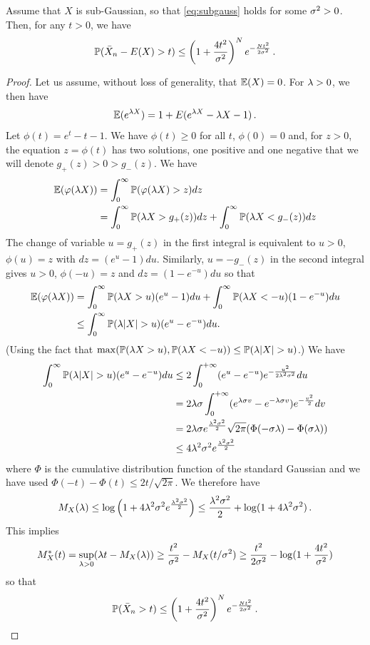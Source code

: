 \begin{proposition}
\label{prop:subg}
Assume that $X$ is sub-Gaussian, so that \eqref{eq:subgauss} holds for some $\sigma^2>0$. Then, for any $t>0$, we have
\[
\bm{\mathbb P}(\bar X_n - E(X) > t) \leq \left(1 + \frac{4t^2}{\sigma^2}\right)^N e^{-\frac{Nt^2}{2\sigma^2}}\,.
\]
\end{proposition}
\begin{proof}
Let us assume, without loss of generality, that $\bm{\mathbb E}(X) = 0$. For  $\lambda>0$, we then have
\[
\bm{\mathbb E}(e^{\lambda X}) = 1 + E(e^{\lambda X} - \lambda X - 1)\,.
\]
Let $\phi(t) = e^t - t - 1$. We have $\phi(t) \geq 0$ for all $t$, $\phi(0) = 0$ and, for $z>0$, the equation $z = \phi(t)$ has two solutions, one positive and one negative that we will denote $g_+(z) > 0 > g_-(z)$. We have
\begin{align*}
\bm{\mathbb E}(\varphi(\lambda X)) &= \int_0^\infty \bm{\mathbb P}(\varphi(\lambda X) > z) dz \\
&= \int_0^\infty \bm{\mathbb P}(\lambda X > g_+(z)) dz + \int_0^\infty \bm{\mathbb P}(\lambda X < g_-(z)) dz 
\end{align*}
The change of variable $u = g_+(z)$ in the first integral is equivalent to $u>0$, $\phi(u) = z$ with $dz = (e^u-1) du$. Similarly, $u=-g_-(z)$ in the second integral gives $u>0$, $\phi(-u) = z$ and $dz = (1-e^{-u})du$ so that
\begin{align*}
\bm{\mathbb E}(\varphi(\lambda X)) &= \int_0^\infty \bm{\mathbb P}(\lambda X > u) (e^u-1)du + \int_0^\infty \bm{\mathbb P}(\lambda X < -u) (1-e^{-u}) du\\
& \leq \int_0^\infty \bm{\mathbb P}(\lambda |X| > u) (e^u-e^{-u}) du.
\end{align*}
(Using the fact that $\max(\bm{\mathbb P}(\lambda X > u), \bm{\mathbb P}(\lambda X < -u)) \leq \bm{\mathbb P}(\lambda|X| > u)$.) We have
\begin{align*} 
\int_0^\infty \bm{\mathbb P}(\lambda |X| > u) (e^u-e^{-u}) du &\leq 2 \int_0^{+\infty}  (e^{u} - e^{-u}) e^{- \frac{u^2}{2\lambda^2\sigma^2}} du \\
&= 2\lambda\sigma \int_0^{+\infty} (e^{\lambda\sigma v} - e^{-\lambda\sigma v}) e^{- \frac{v^2}{2}} dv\\
&= 2\lambda\sigma e^{\frac{\lambda^2\sigma^2}2} \sqrt{2\pi} (\Phi(- \sigma\lambda) - \Phi(\sigma\lambda))\\
&\leq 4\lambda^2\sigma^2 e^{\frac{\lambda^2\sigma^2}2}
\end{align*}
where $\Phi$ is the cumulative distribution function of the standard Gaussian and we have used $\Phi(-t) - \Phi(t) \leq 2t/\sqrt{2\pi}$.
We therefore have
\[
M_X(\lambda) \leq \log\left(1 + 4\lambda^2\sigma^2 e^{\frac{\lambda^2\sigma^2}2}\right) 
\leq \frac{\lambda^2\sigma^2}2 + \log(1 + 4\lambda^2\sigma^2)\,.
\]
This implies
\[
M_X^*(t) =   \sup_{\lambda>0} (\lambda t - M_X(\lambda)) \geq \frac{t^2}{\sigma^2} - M_X(t/\sigma^2) \geq \frac{t^2}{2\sigma^2} - \log(1 + \frac{4t^2}{\sigma^2})
\]
so that 
\[
\bm{\mathbb P}(\bar X_n > t) \leq \left(1 + \frac{4t^2}{\sigma^2}\right)^N e^{-\frac{Nt^2}{2\sigma^2}}\,.
\]
\end{proof}

